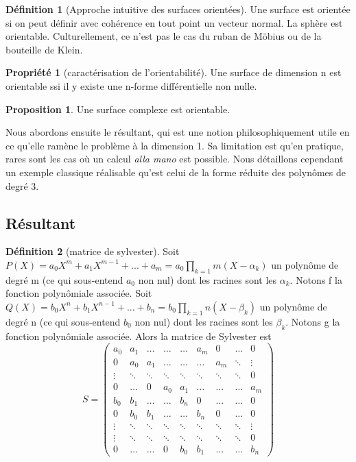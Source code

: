 \documentclass{article}
\theoremstyle{definition} %
\newtheorem{defi}{Définition}
\newtheorem{prop}{Proposition}
\newtheorem{propri}{Propriété}
\newcommand{\1}{\mathbb{1}} %
\begin{document}
\begin{defi}[Approche intuitive des surfaces orientées]
Une surface est orientée si on peut définir avec cohérence en tout point un vecteur normal. La sphère est orientable. Culturellement, ce n'est pas le cas du ruban de Möbius ou de la bouteille de Klein.
\end{defi}

\begin{propri}[caractérisation de l'orientabilité]
Une surface de dimension n est orientable ssi il y existe une n-forme différentielle non nulle.
\end{propri}

\begin{prop}
Une surface complexe est orientable.
\end{prop}



Nous abordons ensuite le résultant, qui est une notion philosophiquement utile en ce qu'elle ramène le problème à la dimension 1.
Sa limitation est qu'en pratique, rares sont les cas où un calcul \textit{alla mano} est possible. Nous détaillons cependant un exemple classique réalisable qu'est celui de la forme réduite des polynômes de degré 3.

\subsection{Résultant}

\begin{defi}[matrice de sylvester]
Soit $P(X)=a_0 X^m + a_1 X^{m-1} + ... + a_m = a_0 \prod_{k=1}{m} (X- \alpha_k)$ un polynôme de degré m (ce qui sous-entend $a_0$ non nul) dont les racines sont les $\alpha_k$. Notons f la fonction polynômiale associée.
Soit $Q(X)=b_0 X^n + b_1 X^{n-1} + ... + b_n = b_0 \prod_{k=1}{n} (X- \beta_k)$ un polynôme de degré n (ce qui sous-entend $b_0$ non nul) dont les racines sont les $\beta_k$. Notons g la fonction polynômiale associée.
Alors la matrice de Sylvester est
$$S=
\begin{pmatrix}
a_0 & a_1 & \dots & \dots & \dots & a_m & 0 & \dots & 0 \\
0 & a_0 & a_1 & \dots & \dots & \dots & a_m & \ddots & \vdots \\
\vdots & \ddots & \ddots & \ddots & \ddots & \ddots & \ddots & \ddots & 0 \\
0 & \dots & 0 & a_0 & a_1 & \dots & \dots & \dots & a_m \\
b_0 & b_1 & \dots & \dots & b_n & 0 & \dots & \dots & 0 \\
0 & b_0 & b_1 & \dots & \dots & b_n & 0 & \dots & 0 \\
\vdots & \ddots & \ddots & \ddots & \ddots & \ddots & \ddots & \ddots & \vdots \\
\vdots & \ddots & \ddots & \ddots & \ddots & \ddots & \ddots & \ddots & 0 \\
0 & \dots & \dots & 0 & b_0 & b_1 & \dots & \dots & b_n
\end{pmatrix}
$$
\end{defi}
\end{document}
